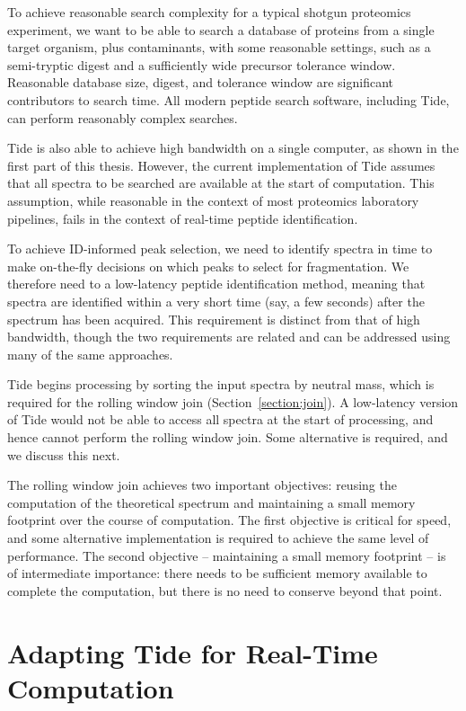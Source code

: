 \documentclass[12pt,twoside,openright]{report}
\begin{document}
To achieve reasonable search complexity for a typical shotgun proteomics
experiment, we want to be able to search a database of proteins from a single
target organism, plus contaminants, with some reasonable settings, such as a
semi-tryptic digest and a sufficiently wide precursor tolerance
window. Reasonable database size, digest, and tolerance window are significant
contributors to search time. All modern peptide search software, including Tide,
can perform reasonably complex searches.

Tide is also able to achieve high bandwidth on a single computer, as shown in
the first part of this thesis. However, the current implementation of Tide
assumes that all spectra to be searched are available at the start of
computation. This assumption, while reasonable in the context of most proteomics
laboratory pipelines, fails in the context of real-time peptide identification.

To achieve ID-informed peak selection, we need to identify spectra in time to
make on-the-fly decisions on which peaks to select for fragmentation. We
therefore need to a low-latency peptide identification method, meaning that
spectra are identified within a very short time (say, a few seconds) after the
spectrum has been acquired. This requirement is distinct from that of high
bandwidth, though the two requirements are related and can be addressed using
many of the same approaches.

Tide begins processing by sorting the input spectra by neutral mass, which is
required for the rolling window join (Section~\ref{section:join}). A
low-latency version of Tide would not be able to access all spectra at the start
of processing, and hence cannot perform the rolling window join. Some
alternative is required, and we discuss this next.

The rolling window join achieves two important objectives: reusing the
computation of the theoretical spectrum and maintaining a small memory footprint
over the course of computation. The first objective is critical for speed, and
some alternative implementation is required to achieve the same level of
performance. The second objective -- maintaining a small memory footprint -- is
of intermediate importance: there needs to be sufficient memory available to
complete the computation, but there is no need to conserve beyond that point.

\section{Adapting Tide for Real-Time Computation}
\end{document}
